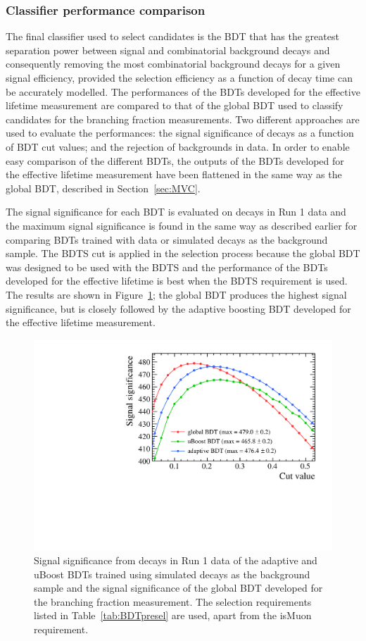 \subsubsection{Classifier performance comparison}
\label{sec:BDTcomp}
The final classifier used to select \bsmumu candidates is the BDT that has the greatest separation power between signal and combinatorial background decays and consequently removing the most combinatorial background decays for a given signal efficiency, provided the selection efficiency as a function of decay time can be accurately modelled. The performances of the BDTs developed for the effective lifetime measurement are compared to that of the global BDT used to classify candidates for the branching fraction measurements. Two different approaches are used to evaluate the performances: the signal significance of \bhh decays as a function of BDT cut values; and the rejection of \bsmumu backgrounds in data. In order to enable easy comparison of the different BDTs, the outputs of the BDTs developed for the effective lifetime measurement have been flattened in the same way as the global BDT, described in Section~\ref{sec:MVC}. %

The signal significance for each BDT is evaluated on \bhh decays in Run 1 data and the maximum signal significance is found in the same way as described earlier for comparing BDTs trained with data or simulated decays as the background sample. The BDTS cut is applied in the selection process because the global BDT was designed to be used with the BDTS and the performance of the BDTs developed for the effective lifetime is best when the BDTS requirement is used. The results are shown in Figure~\ref{fig:SSall}; the global BDT produces the highest signal significance, but is closely followed by the adaptive boosting BDT developed for the effective lifetime measurement. 

\begin{figure}[tbp]
    \centering
        \includegraphics[width=0.8 \textwidth]{./Figs/Selection/BDT_comp_zoom.pdf}
    \caption{Signal significance from \bhh decays in Run 1 data of the adaptive and uBoost BDTs trained using simulated decays as the background sample and the signal significance of the global BDT developed for the branching fraction measurement. The selection requirements listed in Table~\ref{tab:BDTpresel} are used, apart from the isMuon requirement. }
    \label{fig:SSall}
\end{figure}


